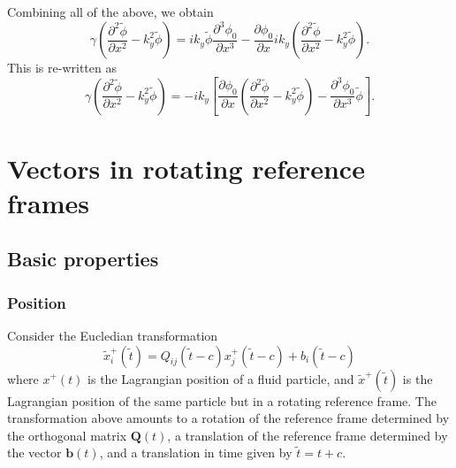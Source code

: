 \documentclass[oneside,a4paper,11pt]{report}
\begin{document}
Combining all of the above, we obtain
\begin{equation}
    \gamma \left ( \frac{\partial^2 \tilde{\phi}}{\partial x^2} - k_y^2 \tilde{\phi} \right ) = ik_y \tilde{\phi} \frac{\partial^3 \phi_0}{\partial x^3} - \frac{\partial \phi_0}{\partial x} i k_y \left ( \frac{\partial^2 \tilde{\phi}}{\partial x^2} - k_y^2 \tilde{\phi} \right ).
\end{equation}
This is re-written as 
\begin{equation}
    \gamma \left ( \frac{\partial^2 \tilde{\phi}}{\partial x^2} - k_y^2 \tilde{\phi} \right ) = -i k_y \left [ \frac{\partial \phi_0}{\partial x} \left ( \frac{\partial^2 \tilde{\phi}}{\partial x^2} - k_y^2 \tilde{\phi} \right ) - \frac{\partial^3 \phi_0}{\partial x^3} \tilde{\phi} \right ].
\end{equation}

%
%
\appendix
%
%

%
\chapter{Vectors in rotating reference frames}
%

\section{Basic properties}

\subsection{Position}
Consider the Eucledian transformation
\begin{equation}
\label{eq:x_rot}
\tilde{x}^+_i(\tilde{t}) = Q_{ij}(\tilde{t}-c) x^+_j(\tilde{t}-c) + b_i(\tilde{t}-c) 
\end{equation}
where $x^+(t)$ is the Lagrangian position of a fluid particle, and $\tilde{x}^+(\tilde{t})$ is the Lagrangian position of the same particle but in a rotating reference frame. The transformation above amounts to a rotation of the reference frame determined by the orthogonal matrix $\mathbf{Q}(t)$, a translation of the reference frame determined by the vector $\mathbf{b}(t)$, and a translation in time given by $\tilde{t} = t + c$. 
\end{document}
